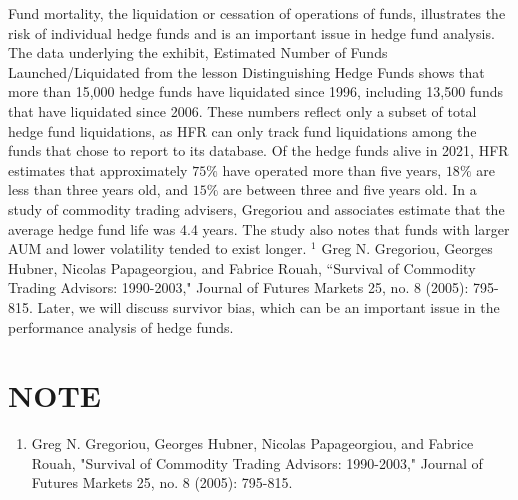 \documentclass[11pt]{article}
\begin{document}
Fund mortality, the liquidation or cessation of operations of funds, illustrates the risk of individual hedge funds and is an important issue in hedge fund analysis. The data underlying the exhibit, Estimated Number of Funds Launched/Liquidated from the lesson Distinguishing Hedge Funds shows that more than 15,000 hedge funds have liquidated since 1996, including 13,500 funds that have liquidated since 2006. These numbers reflect only a subset of total hedge fund liquidations, as HFR can only track fund liquidations among the funds that chose to report to its database. Of the hedge funds alive in 2021, HFR estimates that approximately $75 \%$ have operated more than five years, $18 \%$ are less than three years old, and $15 \%$ are between three and five years old. In a study of commodity trading advisers, Gregoriou and associates estimate that the average hedge fund life was 4.4 years. The study also notes that funds with larger AUM and lower volatility tended to exist longer. ${ }^{1}$ Greg N. Gregoriou, Georges Hubner, Nicolas Papageorgiou, and Fabrice Rouah, “Survival of Commodity Trading Advisors: 1990-2003," Journal of Futures Markets 25, no. 8 (2005): 795-815. Later, we will discuss survivor bias, which can be an important issue in the performance analysis of hedge funds.

\section*{NOTE}
\begin{enumerate}
  \item Greg N. Gregoriou, Georges Hubner, Nicolas Papageorgiou, and Fabrice Rouah, "Survival of Commodity Trading Advisors: 1990-2003," Journal of Futures Markets 25, no. 8 (2005): 795-815.
\end{enumerate}
\end{document}

